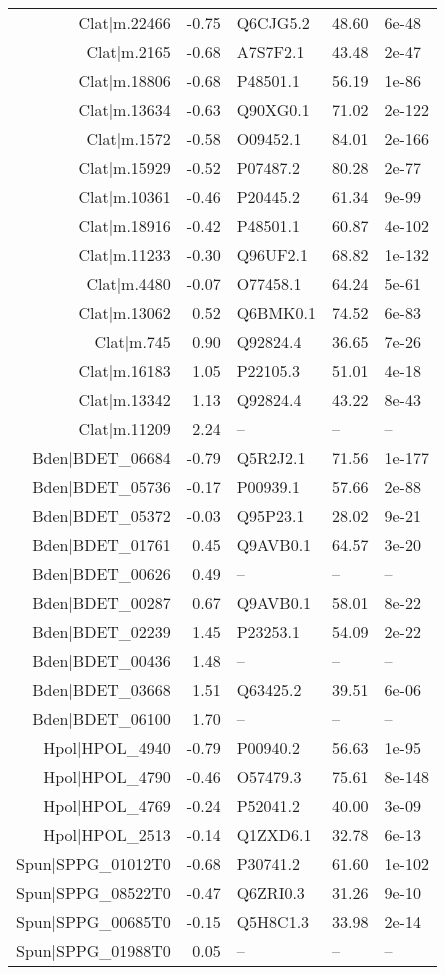\begin{table}[htbp]
{{\begin{tabular}{rrlll}
  Clat$|$m.22466 & -0.75 & Q6CJG5.2 & 48.60 & 6e-48 \\ 
  Clat$|$m.2165 & -0.68 & A7S7F2.1 & 43.48 & 2e-47 \\ 
  Clat$|$m.18806 & -0.68 & P48501.1 & 56.19 & 1e-86 \\ 
  Clat$|$m.13634 & -0.63 & Q90XG0.1 & 71.02 & 2e-122 \\ 
  Clat$|$m.1572 & -0.58 & O09452.1 & 84.01 & 2e-166 \\ 
  Clat$|$m.15929 & -0.52 & P07487.2 & 80.28 & 2e-77 \\ 
  Clat$|$m.10361 & -0.46 & P20445.2 & 61.34 & 9e-99 \\ 
  Clat$|$m.18916 & -0.42 & P48501.1 & 60.87 & 4e-102 \\ 
  Clat$|$m.11233 & -0.30 & Q96UF2.1 & 68.82 & 1e-132 \\ 
  Clat$|$m.4480 & -0.07 & O77458.1 & 64.24 & 5e-61 \\ 
  Clat$|$m.13062 & 0.52 & Q6BMK0.1 & 74.52 & 6e-83 \\ 
  Clat$|$m.745 & 0.90 & Q92824.4 & 36.65 & 7e-26 \\ 
  Clat$|$m.16183 & 1.05 & P22105.3 & 51.01 & 4e-18 \\ 
  Clat$|$m.13342 & 1.13 & Q92824.4 & 43.22 & 8e-43 \\ 
  Clat$|$m.11209 & 2.24 & -- & -- & -- \\ 
  Bden$|$BDET\_06684 & -0.79 & Q5R2J2.1 & 71.56 & 1e-177 \\ 
  Bden$|$BDET\_05736 & -0.17 & P00939.1 & 57.66 & 2e-88 \\ 
  Bden$|$BDET\_05372 & -0.03 & Q95P23.1 & 28.02 & 9e-21 \\ 
  Bden$|$BDET\_01761 & 0.45 & Q9AVB0.1 & 64.57 & 3e-20 \\ 
  Bden$|$BDET\_00626 & 0.49 & -- & -- & -- \\ 
  Bden$|$BDET\_00287 & 0.67 & Q9AVB0.1 & 58.01 & 8e-22 \\ 
  Bden$|$BDET\_02239 & 1.45 & P23253.1 & 54.09 & 2e-22 \\ 
  Bden$|$BDET\_00436 & 1.48 & -- & -- & -- \\ 
  Bden$|$BDET\_03668 & 1.51 & Q63425.2 & 39.51 & 6e-06 \\ 
  Bden$|$BDET\_06100 & 1.70 & -- & -- & -- \\ 
  Hpol$|$HPOL\_4940 & -0.79 & P00940.2 & 56.63 & 1e-95 \\ 
  Hpol$|$HPOL\_4790 & -0.46 & O57479.3 & 75.61 & 8e-148 \\ 
  Hpol$|$HPOL\_4769 & -0.24 & P52041.2 & 40.00 & 3e-09 \\ 
  Hpol$|$HPOL\_2513 & -0.14 & Q1ZXD6.1 & 32.78 & 6e-13 \\ 
  Spun$|$SPPG\_01012T0 & -0.68 & P30741.2 & 61.60 & 1e-102 \\ 
  Spun$|$SPPG\_08522T0 & -0.47 & Q6ZRI0.3 & 31.26 & 9e-10 \\ 
  Spun$|$SPPG\_00685T0 & -0.15 & Q5H8C1.3 & 33.98 & 2e-14 \\ 
  Spun$|$SPPG\_01988T0 & 0.05 & -- & -- & -- \\ 
   \hline
\end{tabular}
}
}
\end{table}
